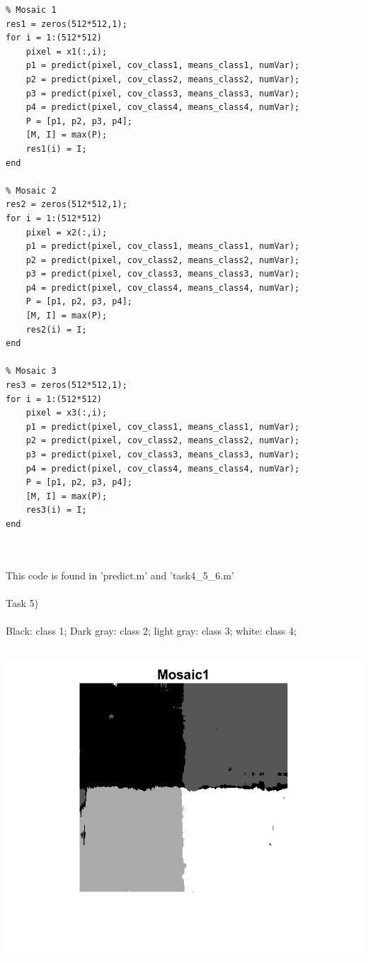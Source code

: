 \documentclass[12pt, letterpaper, twoside]{article}
\begin{document}
\begin{verbatim}
% Mosaic 1
res1 = zeros(512*512,1);
for i = 1:(512*512)
    pixel = x1(:,i);
    p1 = predict(pixel, cov_class1, means_class1, numVar);
    p2 = predict(pixel, cov_class2, means_class2, numVar);
    p3 = predict(pixel, cov_class3, means_class3, numVar);
    p4 = predict(pixel, cov_class4, means_class4, numVar);
    P = [p1, p2, p3, p4];
    [M, I] = max(P);
    res1(i) = I;
end

% Mosaic 2
res2 = zeros(512*512,1);
for i = 1:(512*512)
    pixel = x2(:,i);
    p1 = predict(pixel, cov_class1, means_class1, numVar);
    p2 = predict(pixel, cov_class2, means_class2, numVar);
    p3 = predict(pixel, cov_class3, means_class3, numVar);
    p4 = predict(pixel, cov_class4, means_class4, numVar);
    P = [p1, p2, p3, p4];
    [M, I] = max(P);
    res2(i) = I;
end

% Mosaic 3
res3 = zeros(512*512,1);
for i = 1:(512*512)
    pixel = x3(:,i);
    p1 = predict(pixel, cov_class1, means_class1, numVar);
    p2 = predict(pixel, cov_class2, means_class2, numVar);
    p3 = predict(pixel, cov_class3, means_class3, numVar);
    p4 = predict(pixel, cov_class4, means_class4, numVar);
    P = [p1, p2, p3, p4];
    [M, I] = max(P);
    res3(i) = I;
end
\end{verbatim}
\ \\
\ \\
This code is found in 'predict.m' and 'task4\_5\_6.m'\\
\newpage
\ \\
Task 5)\\
\ \\
Black: class 1; Dark gray: class 2; light gray: class 3; white: class 4;\\
\ \\
\begin{minipage}{0.45\textwidth}
\includegraphics[scale=0.45]{"result_mosaic1"}\\
\end{minipage}%
\end{document}
